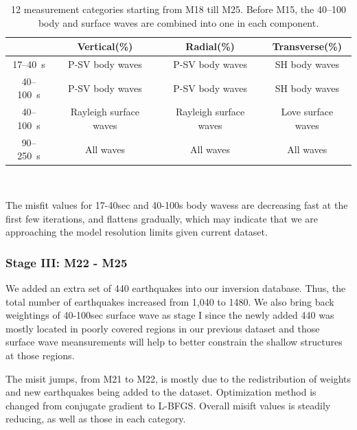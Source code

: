 \documentclass[extra,mreferee]{gji}
\begin{document}
\begin{table}[!htb]
  \centering
  \begin{tabular}{|c|c|c|c|}
    \hline
    ~          &  Vertical(\%) & Radial(\%) &  Transverse(\%) \\
    \hline
    17--40~s   &   P-SV body waves          & P-SV body waves           & SH body waves   \\
    40--100~s  &   P-SV body waves          & P-SV body waves           & SH body waves \\
    40--100~s  &   Rayleigh surface waves   & Rayleigh surface waves    & Love surface waves \\
    90--250~s  &   All waves                & All waves                 & All waves \\
    \hline
  \end{tabular}\\
  \caption{12 measurement categories starting from M18 till M25. Before M15, the 40--100 body and surface waves are combined into one in each component.}
  \label{table:measurement_category}
\end{table}



The misfit values for 17-40sec and 40-100s body wavess are decreasing fast at
the first few iterations, and flattens gradually, which may indicate that we are
approaching the model resolution limits given current dataset.

\subsubsection{Stage III: M22 - M25}

We added an extra set of 440 earthquakes into our inversion database. Thus, the total
number of earthquakes increased from 1,040 to 1480. We also bring back weightings
of 40-100sec surface wave as stage I since the newly added 440 was mostly located
in poorly covered regions in our previous dataset and those surface wave meansurements
will help to better constrain the shallow structures at those regions.

The misit jumps, from M21 to M22, is mostly due to the redistribution of weights
and new earthquakes being added to the dataset. Optimization method is changed
from conjugate gradient to L-BFGS. Overall misift values is steadily reducing,
as well as those in each category.
\end{document}
